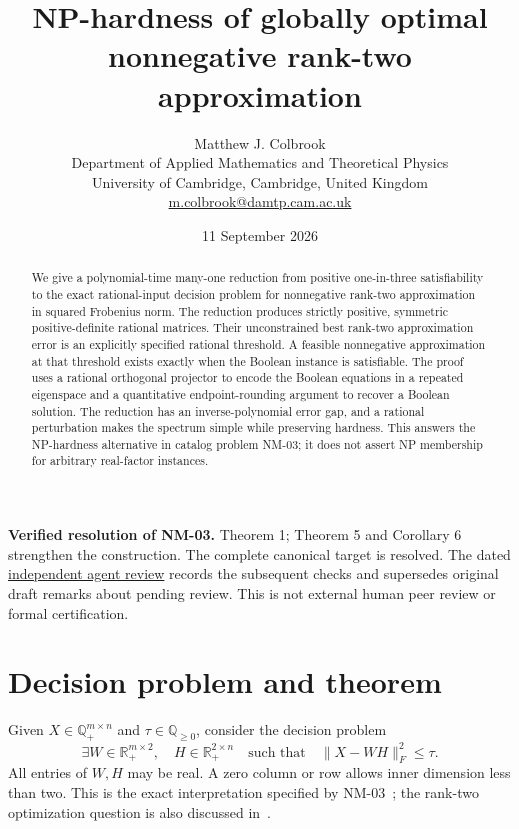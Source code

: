\documentclass[11pt]{article}
\title{NP-hardness of globally optimal nonnegative rank-two approximation}
\author{Matthew J. Colbrook\\\small Department of Applied Mathematics and Theoretical Physics\\\small University of Cambridge, Cambridge, United Kingdom\\\small\href{mailto:m.colbrook@damtp.cam.ac.uk}{m.colbrook@damtp.cam.ac.uk}}\date{11 September 2026}
\newcommand{\R}{\mathbb R}
\newcommand{\Q}{\mathbb Q}
\begin{document}
\maketitle

\noindent\textbf{Verified resolution of NM-03.} Theorem 1; Theorem 5 and Corollary 6 strengthen the construction. The complete canonical target is resolved.
The dated \href{https://github.com/MColbrook/OpenProblemsInNLA/blob/codex/colbrook-factorization-resolutions/references/colbrook-factorization-2026-09-11/verification/reviews/NM-03-review.md}{independent agent review} records the subsequent checks and supersedes original draft remarks about pending review. This is not external human peer review or formal certification.
\par\medskip

\begin{abstract}
We give a polynomial-time many-one reduction from positive one-in-three satisfiability to the exact rational-input decision problem for nonnegative rank-two approximation in squared Frobenius norm. The reduction produces strictly positive, symmetric positive-definite rational matrices. Their unconstrained best rank-two approximation error is an explicitly specified rational threshold. A feasible nonnegative approximation at that threshold exists exactly when the Boolean instance is satisfiable. The proof uses a rational orthogonal projector to encode the Boolean equations in a repeated eigenspace and a quantitative endpoint-rounding argument to recover a Boolean solution. The reduction has an inverse-polynomial error gap, and a rational perturbation makes the spectrum simple while preserving hardness. This answers the NP-hardness alternative in catalog problem NM-03; it does not assert NP membership for arbitrary real-factor instances.
\end{abstract}

\section{Decision problem and theorem}
Given $X\in\Q_+^{m\times n}$ and $\tau\in\Q_{\geq0}$, consider the decision problem
\begin{equation}\label{eq:decision}
 \exists W\in\R_+^{m\times2},\quad H\in\R_+^{2\times n}
 \quad\text{such that}\quad \|X-WH\|_F^2\leq\tau.
\end{equation}
All entries of $W,H$ may be real. A zero column or row allows inner dimension less than two. This is the exact interpretation specified by NM-03~\cite{catalog}; the rank-two optimization question is also discussed in~\cite{lnv}.
\end{document}
